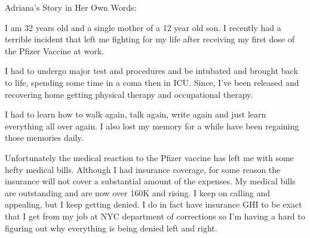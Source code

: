Adriana’s Story in Her Own Words:

I am 32 years old and a single mother of a 12 year old son. I recently had a
terrible incident that left me fighting for my life after receiving my first
dose of the Pfizer Vaccine at work.

I had to undergo major test and procedures and be intubated and brought back to
life, spending some time in a coma then in ICU. Since, I’ve been released and
recovering home getting physical therapy and occupational therapy.

I had to learn how to walk again, talk again, write again and just learn
everything all over again. I also lost my memory for a while have been regaining
those memories daily.

Unfortunately the medical reaction to the Pfizer vaccine has left me with some
hefty medical bills. Although I had insurance coverage, for some reason the
insurance will not cover a substantial amount of the expenses. My medical bills
are outstanding and are now over 160K and rising. I keep on calling and
appealing, but I keep getting denied. I do in fact have insurance GHI to be
exact that I get from my job at NYC department of corrections so I’m having a
hard to figuring out why everything is being denied left and right.

